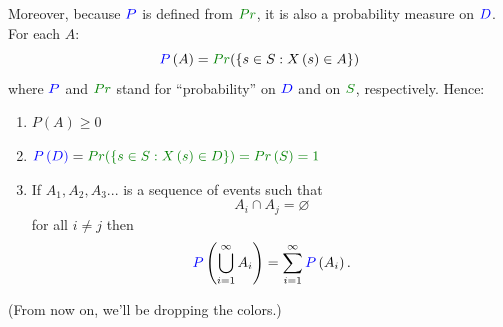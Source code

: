 \documentclass[smaller, handout]{beamer}\usepackage[]{graphicx}\usepackage[]{color}
\begin{document}
\begin{frame}{\secname}

Moreover, because $\color{blue}{P}$ is defined from $\color{Mygreen}{Pr}$, it is also {a probability measure} on $\color{blue}{D}$.
\pause
For each $A$:
  \begin{equation*}
  \color{blue}P\color{black}\left( A\right) = \color{Mygreen} {Pr} \color{black}( \left\{ s\in S :X\left(  s  \right) \in
  A\right\})
  \end{equation*}
  where $\color{blue}P \color{black}$ and $\color{Mygreen} Pr \color{black}$ stand for ``probability'' on $\color{blue} D \color{black}$
  and on $\color{Mygreen} S \color{black}$, respectively.
  Hence:
  \begin{enumerate}

  \item $P \left( A\right) \geq 0$
  \vspace{0.15cm}
  \item $\color{blue}P \left( D\right) \color{black}=\color{Mygreen}Pr (\left\{ s\in S:X\left( s\right)
  \in D\right\}) =Pr \left( S\right) =1 \color{black}$
  \vspace{0.15cm}
  \item If $A_{1},A_{2},A_{3}...$ is a sequence of events
  such that $$A_{i}\cap A_{j}=\varnothing $$ for all $i\neq j$ then
  $$\color{blue}P \color{black} \left(
  \bigcup _{i=1}^{\infty }A_{i}\right) =\sum_{i=1}^{\infty } \color{blue} P  \color{black} \left(
  A_{i}\right) . $$
  \end{enumerate}
  (From now on, we'll be dropping the colors.)
\end{frame}%
\end{document}
